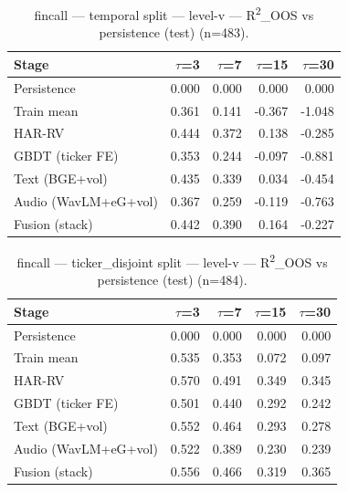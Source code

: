 
\begin{table}[t]
\centering
\begin{tabular}{lrrrr}
\toprule
Stage & $\tau$=3 & $\tau$=7 & $\tau$=15 & $\tau$=30 \\
\midrule
Persistence & 0.000 & 0.000 & 0.000 & 0.000 \\
Train mean & 0.361 & 0.141 & -0.367 & -1.048 \\
HAR-RV & 0.444 & 0.372 & 0.138 & -0.285 \\
GBDT (ticker FE) & 0.353 & 0.244 & -0.097 & -0.881 \\
Text (BGE+vol) & 0.435 & 0.339 & 0.034 & -0.454 \\
Audio (WavLM+eG+vol) & 0.367 & 0.259 & -0.119 & -0.763 \\
Fusion (stack) & 0.442 & 0.390 & 0.164 & -0.227 \\
\bottomrule
\end{tabular}
\caption{fincall — temporal split — level-v — R\textsuperscript{2}\_OOS vs persistence (test) (n=483).}
\end{table}

\begin{table}[t]
\centering
\begin{tabular}{lrrrr}
\toprule
Stage & $\tau$=3 & $\tau$=7 & $\tau$=15 & $\tau$=30 \\
\midrule
Persistence & 0.000 & 0.000 & 0.000 & 0.000 \\
Train mean & 0.535 & 0.353 & 0.072 & 0.097 \\
HAR-RV & 0.570 & 0.491 & 0.349 & 0.345 \\
GBDT (ticker FE) & 0.501 & 0.440 & 0.292 & 0.242 \\
Text (BGE+vol) & 0.552 & 0.464 & 0.293 & 0.278 \\
Audio (WavLM+eG+vol) & 0.522 & 0.389 & 0.230 & 0.239 \\
Fusion (stack) & 0.556 & 0.466 & 0.319 & 0.365 \\
\bottomrule
\end{tabular}
\caption{fincall — ticker\_disjoint split — level-v — R\textsuperscript{2}\_OOS vs persistence (test) (n=484).}
\end{table}

